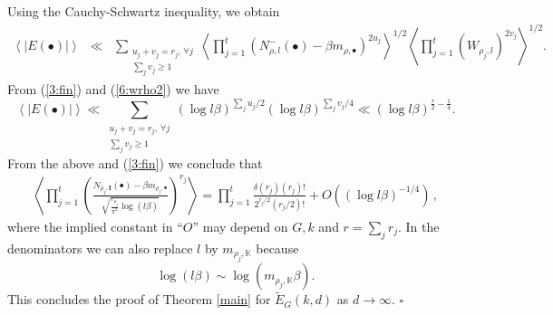 \documentclass[12pt]{amsart}
\theoremstyle{plain}
\begin{document}
Using the Cauchy-Schwartz inequality, we obtain
\begin{eqnarray*} \left\langle |E(\bullet)|\right\rangle
&\ll & \sum_{\substack{u_j+v_j=r_j, \, \forall j \\
\sum_j v_j \ge 1}} \left\langle \prod_{j=1}^t \left(N_{\rho,l}^-(\bullet)- \beta m_{\rho,\bullet}\right)^{2u_j} \right\rangle^{1/2} \left\langle \prod_{j=1}^t (W_{\rho_j,l})^{2v_j} \right\rangle^{1/2}.\end{eqnarray*}
From (\ref{3:fin}) and (\ref{6:wrho2}) we have
\[\left\langle |E(\bullet)|\right\rangle \ll \sum_{\substack{u_j+v_j=r_j, \, \forall j \\
\sum_j v_j \ge 1}} (\log l \beta)^{\sum_j u_j/2} (\log l \beta)^{\sum_{j}v_j/4} \ll (\log l \beta)^{\frac{r}{2}-\frac{1}{4}}. \]
From the above and (\ref{3:fin}) we conclude that
\begin{eqnarray} \label{4:fin} \left\langle \prod_{j=1}^t \left(\frac{N_{\rho_j,{{\mathbf I}}}(\bullet)-\beta m_{\rho_j,\bullet}}{\sqrt{ \frac{r_{\rho_j}}{\pi^2}\log (l\beta)}}\right)^{r_j} \right\rangle= \prod_{j=1}^t\frac{\delta(r_j) (r_j)! }{2^{r_j/2} \left(r_j/2\right)! } +O\left(\left(\log l\beta\right)^{-1/4} \right)\,, \end{eqnarray}
where the implied constant in ``$O$'' may depend on $G,k$ and $r=\sum_{j}r_j$. In the denominators we can also replace $l$ by $m_{\rho_j,{{\mathbb K}}}$ because
\[\log (l \beta) \sim \log (m_{\rho_j,{{\mathbb K}}} \beta). \]
This concludes the proof of Theorem \ref{main} for $\widetilde{E}_G(k,d)$ as $d \to \infty$. \quad $\square$
\end{document}
